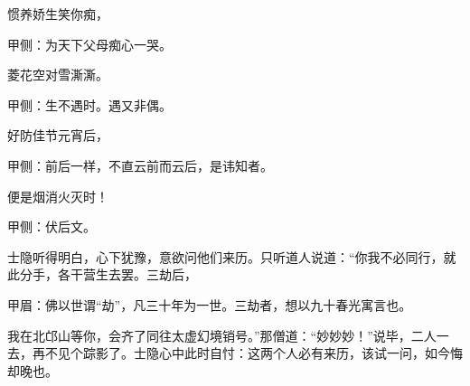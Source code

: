 \begin{poem}
    \begin{pl}惯养娇生笑你痴，\end{pl}\begin{note}甲侧：为天下父母痴心一哭。\end{note}

    \begin{pl}菱花空对雪澌澌。\end{pl}\begin{note}甲侧：生不遇时。遇又非偶。\end{note}

    \begin{pl}好防佳节元宵后，\end{pl}\begin{note}甲侧：前后一样，不直云前而云后，是讳知者。\end{note}

    \begin{pl}便是烟消火灭时！\end{pl}\begin{note}甲侧：伏后文。\end{note}
\end{poem}


\begin{parag}
    士隐听得明白，心下犹豫，意欲问他们来历。只听道人说道：“你我不必同行，就此分手，各干营生去罢。三劫后，\begin{note}甲眉：佛以世谓“劫”，凡三十年为一世。三劫者，想以九十春光寓言也。\end{note}我在北邙山等你，会齐了同往太虚幻境销号。”那僧道：“妙妙妙！”说毕，二人一去，再不见个踪影了。士隐心中此时自忖：这两个人必有来历，该试一问，如今悔却晚也。
\end{parag}


